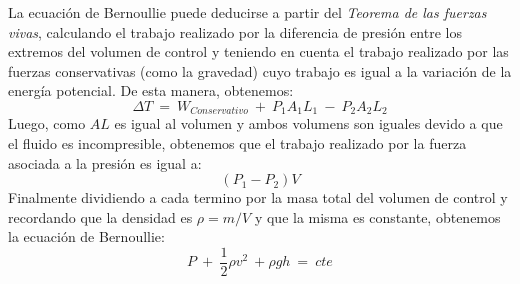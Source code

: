 \documentclass{article}
\begin{document}
La ecuación de Bernoullie puede deducirse a partir del \textit{Teorema de las fuerzas vivas}, calculando el trabajo realizado por la diferencia de presión entre los extremos del volumen de control y teniendo en cuenta el trabajo realizado por las fuerzas conservativas (como la gravedad) cuyo trabajo es igual a la variación de la energía potencial. De esta manera, obtenemos:
\begin{equation*}
\Delta T\ =\ W_{Conservativo}\ +\ P_1 A_1 L_1\ -\ P_2 A_2 L_2
\end{equation*}
Luego, como $AL$ es igual al volumen y ambos volumens son iguales devido a que el fluido es incompresible, obtenemos que el trabajo realizado por la fuerza asociada a la presión es igual a:
\begin{equation*}
(P_1 - P_2)V
\end{equation*}
Finalmente dividiendo a cada termino por la masa total del volumen de control y recordando que la densidad es $\rho=m/V$ y que la misma es constante, obtenemos la ecuación de Bernoullie:
\begin{equation*}
P\ +\ \frac{1}{2}\rho v^2\ + \rho g h\ =\ cte
\end{equation*}

\pagebreak
{}

\end{document}
